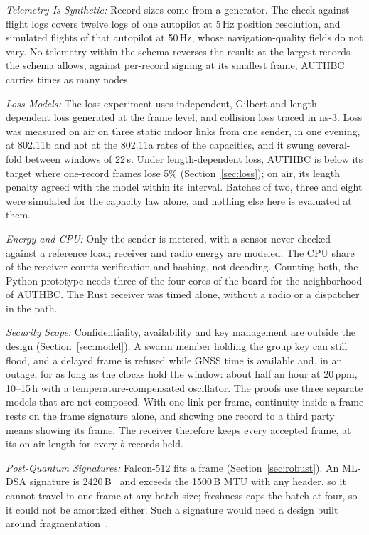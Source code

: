 \documentclass[lineno,pdflatex,sn-mathphys-num]{sn-jnl}
\newcommand{\runin}[1]{\textit{#1:}}
\renewcommand{\_}{\authbcunderscore\allowbreak}
\begin{document}
\runin{Telemetry Is Synthetic} Record sizes come from a generator. The check against flight logs
covers twelve logs of one autopilot at 5\,Hz position resolution, and simulated flights of that
autopilot at 50\,Hz, whose navigation-quality fields do not vary. No telemetry within the schema
reverses the result: at the largest records the schema allows, against per-record signing at its
smallest frame, AUTHBC carries \recLargestRatio{} times as many nodes.

\runin{Loss Models} The loss experiment uses independent, Gilbert and length-dependent loss
generated at the frame level, and collision loss traced in ns-3. Loss was measured on air on three
static indoor links from one sender, in one evening, at 802.11b and not at the 802.11a rates of
the capacities, and it swung several-fold between windows of 22\,s. Under length-dependent loss,
AUTHBC is below its target where one-record frames lose 5\% (Section~\ref{sec:loss}); on air,
its length penalty agreed with the model within its interval. Batches of two, three and eight were simulated for the capacity law
alone, and nothing else here is evaluated at them.

\runin{Energy and CPU} Only the sender is metered, with a sensor never checked against a
reference load; receiver and radio energy are modeled. The CPU share of the receiver counts
verification and hashing, not decoding. Counting both, the Python prototype needs three of the
four cores of the board for the neighborhood of AUTHBC. The Rust receiver was timed alone,
without a radio or a dispatcher in the path.

\runin{Security Scope} Confidentiality, availability and key management are outside the design
(Section~\ref{sec:model}). A swarm member holding the group key can still flood, and a delayed
frame is refused while GNSS time is available and, in an outage, for as long as the clocks hold the
window: about half an hour at 20\,ppm, 10--15\,h with a temperature-compensated oscillator. The
proofs use three separate models that are not composed. With one link per frame, continuity
inside a frame rests on the frame signature alone, and showing one record to a third party means
showing its frame. The receiver therefore keeps every accepted frame, at its on-air length for
every $b$ records held.

\runin{Post-Quantum Signatures} Falcon-512 fits a frame (Section~\ref{sec:robust}). An ML-DSA
signature is 2420\,B~\cite{ndss2024pqv2v} and exceeds the 1500\,B MTU with any header, so it cannot
travel in one frame at any batch size; freshness caps the batch at four, so it could not be
amortized either. Such a signature would need a design built around
fragmentation~\cite{ndss2024pqv2v,sobati2025fragmentsec}.
\end{document}
